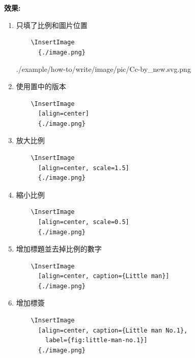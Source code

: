   \newpage
  {\bf 效果:}
  \begin{enumerate}
  \item
  {
    只填了比例和圖片位置
    \begin{verbatim}
    \InsertImage
      {./image.png}
    \end{verbatim}
    \InsertImage
      {./example/how-to/write/image/pic/Cc-by_new.svg.png}
  } %

  \item
  {
    使用置中的版本
    \begin{verbatim}
    \InsertImage
      [align=center]
      {./image.png}
    \end{verbatim}
  } %

  \item
  {
    放大比例
    \begin{verbatim}
    \InsertImage
      [align=center, scale=1.5]
      {./image.png}
    \end{verbatim}
  } %

  \newpage

  \item
  {
    縮小比例
    \begin{verbatim}
    \InsertImage
      [align=center, scale=0.5]
      {./image.png}
    \end{verbatim}
  } %

  \item
  {
    增加標題並去掉比例的數字
    \begin{verbatim}
    \InsertImage
      [align=center, caption={Little man}]
      {./image.png}
    \end{verbatim}
  } %

  \newpage
  \item
  {
    增加標簽
    \begin{verbatim}
    \InsertImage
      [align=center, caption={Little man No.1},
        label={fig:little-man-no.1}]
      {./image.png}
    \end{verbatim}

}
\end{enumerate}
